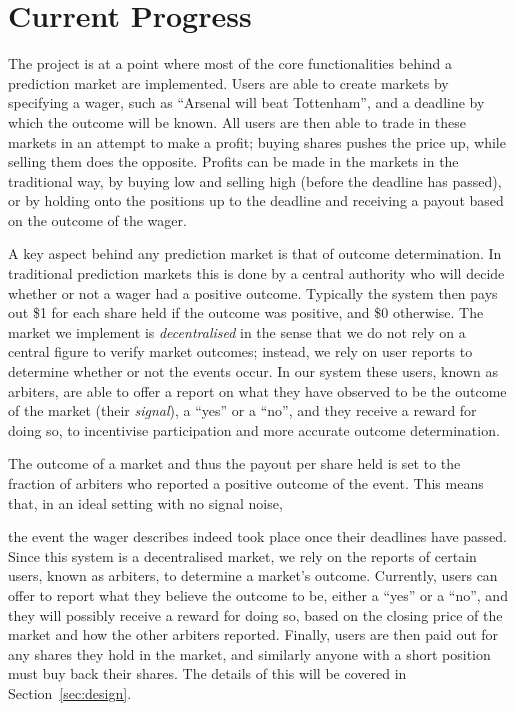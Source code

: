\documentclass[10pt,a4paper]{article}
\theoremstyle{plain}
\theoremstyle{definition}
\begin{document}

\section{Current Progress}

The project is at a point where most of the core functionalities behind a
prediction market are implemented. Users are able to create markets by
specifying a wager, such as ``Arsenal will beat Tottenham'', and a deadline by
which the outcome will be known. All users are then able to trade in these
markets in an attempt to make a profit; buying shares pushes the price up,
while selling them does the opposite. Profits can be made in the markets in the
traditional way, by buying low and selling high (before the deadline has
passed), or by holding onto the positions up to the deadline and receiving a
payout based on the outcome of the wager.

A key aspect behind any prediction market is that of outcome determination. In
traditional prediction markets this is done by a central authority who will
decide whether or not a wager had a positive outcome. Typically the system then
pays out \$1 for each share held if the outcome was positive, and \$0
otherwise. The market we implement is \emph{decentralised} in the sense that
we do not rely on a central figure to verify market outcomes; instead, we rely
on user reports to determine whether or not the events occur. In our system
these users, known as arbiters, are able to offer a report on what they have
observed to be the outcome of the market (their \emph{signal}), a ``yes'' or a
``no'', and they receive a reward for doing so, to incentivise participation
and more accurate outcome determination.

The outcome of a market and thus the payout per share held is set to the
fraction of arbiters who reported a positive outcome of the event. This
means that, in an ideal setting with no signal noise, 

the event the wager describes indeed took place once their deadlines have passed.
Since this system is a decentralised market, we rely on the reports of certain
users, known as arbiters, to determine a market's outcome. Currently, users
can offer to report what they believe the outcome to be, either a ``yes'' or
a ``no'', and they will possibly receive a reward for doing so, based on the
closing price of the market and how the other arbiters reported. Finally,
users are then paid out for any shares they hold in the market, and similarly
anyone with a short position must buy back their shares. The details of this
will be covered in Section~\ref{sec:design}.
\end{document}

